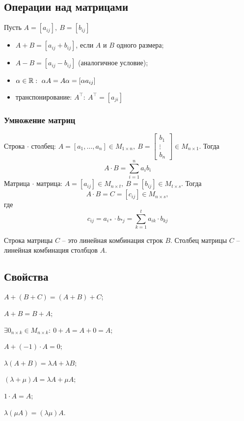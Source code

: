 \begin{multicols}{2}
\subsection*{Операции над матрицами}\par
Пусть $A = [a_{ij}], \ B = [b_{ij}]$
\begin{itemize}
    \item $A+B = [a_{ij} + b_{ij}]$, если $A$ и $B$ одного размера;
    \item $A-B = [a_{ij} - b_{ij}]$ (аналогичное условие);
    \item $\alpha \in \mathbb{R}: \ \alpha A = A\alpha = [\alpha a_{ij}]$
    \item транспонирование: $A^\intercal: \ A^\intercal = [a_{ji}]$
\end{itemize}
\subsubsection*{Умножение матриц}
Строка $\cdot$ столбец: $A = [a_1, \ldots, a_n] \in M_{1\times n}, \ B = \begin{bmatrix}
    b_1\\\vdots\\b_n
\end{bmatrix} \in M_{n\times 1}$. Тогда
\[
    A\cdot B = \sum\limits_{i=1}^n a_ib_i
    \]
Матрица $\cdot$ матрица: $A = [a_{ij}] \in M_{n\times t}, \ B = [b_{ij}] \in M_{t\times s}$. Тогда
\[
    A\cdot B = C = [c_{ij}] \in M_{n\times s},
    \]
где 
\[
    c_{ij} = a_{i*} \cdot b_{*j} = \sum\limits_{k=1}^t a_{ik} \cdot b_{kj}
    \]
\begin{note}{}{}
    Строка матрицы $C$ -- это линейная комбинация строк $B$. Столбец матрицы $C$ -- линейная комбинация столбцов $A$.
\end{note}
\subsection*{Свойства}
\begin{multicols}{2}
\begin{enumerate*}
    \item $A+(B+C) = (A+B) + C$;
    \item $A+B=B+A$;
    \item $\exists 0_{n\times k} \in M_{n\times k}: \ 0+A=A+0=A$;
    \item $A+(-1)\cdot A = 0$;
    \item $\lambda(A+B) = \lambda A + \lambda B$;
    \item $(\lambda + \mu)A = \lambda A + \mu A$;
    \item $1\cdot A = A$;
    \item $\lambda(\mu A) = (\lambda \mu)A$.
\end{enumerate*}
\end{multicols}

\end{multicols}
